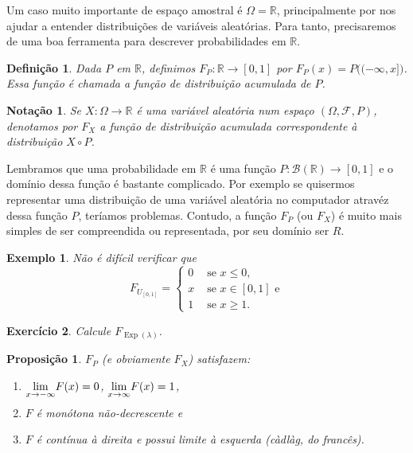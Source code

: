\documentclass[reqno, draft]{book}
\newcommand*\1{\mathds{1}}
\newtheorem{proposition}[theorem]{Proposição}
\newtheorem{definition}[theorem]{Definição}
\newtheorem{notation}[theorem]{Notação}
\newtheorem{example}{Exemplo}[section]
\newtheorem{exercise}[example]{Exercício}
\DeclareMathOperator{\Exp}{Exp}
\begin{document}
Um caso muito importante de espaço amostral é $\Omega = \mathbb{R}$, principalmente por nos ajudar a entender distribuições de variáveis aleatórias.
Para tanto, precisaremos de uma boa ferramenta para descrever probabilidades em $\mathbb{R}$.

\begin{definition}
  Dada $P$ em $\mathbb{R}$, definimos $F_P:\mathbb{R} \to [0,1]$ por $F_P(x) = P\big((-\infty, x]\big)$.
  Essa função é chamada a \emph{função de distribuição} acumulada de $P$. 
\end{definition}

\begin{notation}
  Se $X:\Omega \to \mathbb{R}$ é uma variável aleatória num espaço $(\Omega, \mathcal{F}, P)$, denotamos por $F_X$  a função de distribuição acumulada correspondente à distribuição $X \circ P$.
\end{notation}

Lembramos que uma probabilidade em $\mathbb{R}$ é uma função $P:\mathcal{B}(\mathbb{R}) \to [0,1]$ e o domínio dessa função é bastante complicado.
Por exemplo se quisermos representar uma distribuição de uma variável aleatória no computador atravéz dessa função $P$, teríamos problemas.
Contudo, a função $F_P$ (ou $F_X$) é muito mais simples de ser compreendida ou representada, por seu domínio ser $R$.

\begin{example}
  Não é difícil verificar que
  \begin{equation}
  F_{U_{[0,1]}} =
  \begin{cases}
    0 & \text{ se $x \leq 0$,}\\
    x & \text{ se $x \in [0,1]$ e}\\
    1 & \text{ se $x \geq 1$.}
  \end{cases}
\end{equation}
\end{example}

\begin{exercise}
  Calcule $F_{\Exp(\lambda)}$.
\end{exercise}

\begin{proposition}
  \label{p:propried_F}
  $F_P$ (e obviamente $F_X$) satisfazem:
  \begin{enumerate}[\quad a)]
  \item $\smash{\lim\limits_{x \to -\infty}} F(x) = 0$, $\smash{\lim\limits_{x \to \infty}} F(x) = 1$,
  \item $F$ é monótona não-decrescente e
  \item $F$ é contínua à direita e possui limite à esquerda (càdlàg, do francês). 
  \end{enumerate}
\end{proposition}
\end{document}
